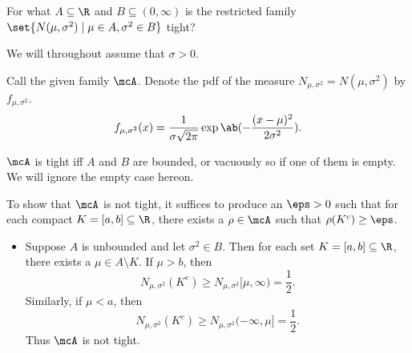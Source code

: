 \documentclass[12pt]{article}
\begin{document}
\begin{problem*}
    For what $A \subseteq \R$ and $B \subseteq (0, \infty)$
    is the restricted family
    $\set{N(\mu, \sigma^2) \mid \mu \in A, \sigma^2 \in B}$ tight?
\end{problem*}
We will throughout assume that $\sigma > 0$.
\begin{solution}
    Call the given family $\mcA$.
    Denote the pdf of the measure $N_{\mu,\sigma^2} = N(\mu, \sigma^2)$
    by $f_{\mu,\sigma^2}$.
    \[
        f_{\mu,\sigma^2}(x) = \frac1{\sigma\sqrt{2\pi}}
            \exp\ab(-\frac{(x-\mu)^2}{2\sigma^2}).
    \]

    $\mcA$ is tight iff $A$ and $B$ are bounded,
    or vacuously so if one of them is empty.
    We will ignore the empty case hereon.

    To show that $\mcA$ is not tight, it suffices to produce an $\eps > 0$
    such that for each compact $K = [a, b] \subseteq \R$, there exists a
    $\rho \in \mcA$ such that $\rho(K^c) \ge \eps$.
    \begin{itemize}
        \item Suppose $A$ is unbounded and let $\sigma^2 \in B$.
        Then for each set $K = [a, b] \subseteq \R$,
        there exists a $\mu \in A \setminus K$.
        If $\mu > b$, then \[
            N_{\mu,\sigma^2}(K^c) \ge N_{\mu,\sigma^2}[\mu,\infty)
                = \frac12.
        \] Similarly, if $\mu < a$, then \[
            N_{\mu,\sigma^2}(K^c) \ge N_{\mu,\sigma^2}(-\infty,\mu]
                = \frac12.
        \] Thus $\mcA$ is not tight.


\end{itemize}
\end{solution}
\end{document}

